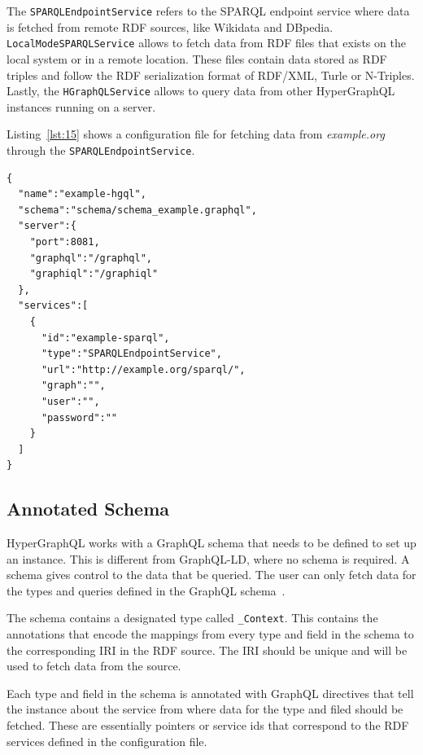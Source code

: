 The \texttt{SPARQLEndpointService} refers to the SPARQL endpoint service where data is fetched from remote RDF sources, like Wikidata and DBpedia. \texttt{LocalModeSPARQLService} allows to fetch data from RDF files that exists on the local system or in a remote location. These files contain data stored as RDF triples and follow the RDF serialization format of RDF/XML, Turle or N-Triples. Lastly, the \texttt{HGraphQLService} allows to query data from other HyperGraphQL instances running on a server.

Listing~\ref{lst:15} shows a configuration file for fetching data from \textit{example.org} through the \texttt{SPARQLEndpointService}.

\begin{minipage}{\linewidth}
\begin{lstlisting}[label=lst:15, caption={An example configuration file}, language=GraphQLException3]
{
  "name":"example-hgql",
  "schema":"schema/schema_example.graphql",
  "server":{
    "port":8081,
    "graphql":"/graphql",
    "graphiql":"/graphiql"
  },
  "services":[
    {
      "id":"example-sparql",
      "type":"SPARQLEndpointService",
      "url":"http://example.org/sparql/",
      "graph":"",
      "user":"",
      "password":""
    }
  ]
}
\end{lstlisting}
\end{minipage}

\subsection{Annotated Schema}
\label{subsec:annotated-schema}
HyperGraphQL works with a GraphQL schema that needs to be defined to set up an instance. This is different from GraphQL-LD, where no schema is required. A schema gives control to the data that be queried. The user can only fetch data for the types and queries defined in the GraphQL schema~\cite{Gleim2020}.

The schema contains a designated type called \texttt{\_Context}. This contains the annotations that encode the mappings from every type and field in the schema to the corresponding IRI in the RDF source. The IRI should be unique and will be used to fetch data from the source. 

Each type and field in the schema is annotated with GraphQL directives that tell the instance about the service from where data for the type and filed should be fetched. These are essentially pointers or service ids that correspond to the RDF services defined in the configuration file.


